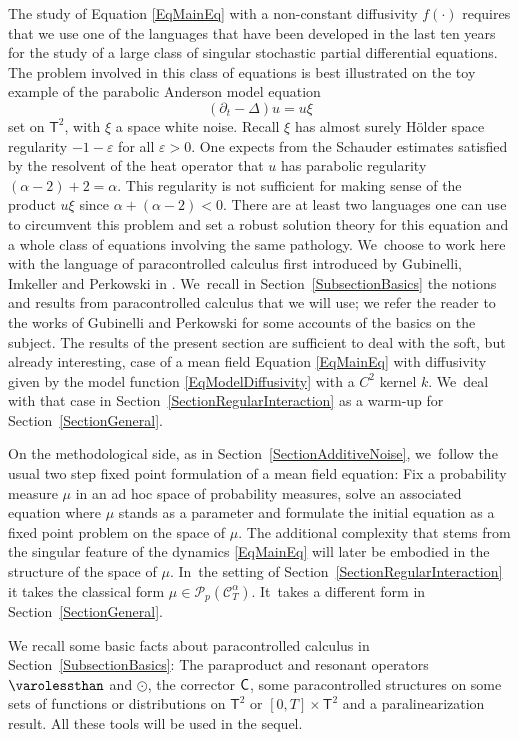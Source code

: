 \documentclass[10pt]{amsart}
\theoremstyle{definition}
\let\epsilon\varepsilon
\newcommand{\bsfT}{\mathbf{\mathsf{T}}}
\newcommand{\mcP}{\mathcal{P}}
\newcommand{\scrC}{\ensuremath{\mathscr{C}}}
\begin{document}
The study of Equation \eqref{EqMainEq} with a non-constant diffusivity $f(\cdot)$ requires that we use one of the languages that have been developed in the last ten years for the study of a large class of singular stochastic partial differential equations. The problem involved in this class of equations is best illustrated on the toy example of the parabolic Anderson model equation
\[
(\partial_t-\Delta)u = u\xi
\]
set on $\bsfT^2$, with $\xi$ a space white noise. Recall $\xi$ has almost surely Hölder space regularity $-1-\epsilon$ for all $\epsilon>0$. One expects from the Schauder estimates satisfied by the resolvent of the heat operator that $u$ has parabolic regularity $(\alpha-2)+2=\alpha$. This regularity is not sufficient for making sense of the product $u\xi$ since $\alpha + (\alpha-2)<0$. There are at least two languages one can use to circumvent this problem and set a robust solution theory for this equation and a whole class of equations involving the same pathology. We~choose to work here with the language of paracontrolled calculus first introduced by Gubinelli, Imkeller and Perkowski in \cite{GIP}. We~recall in Section~\ref{SubsectionBasics} the notions and results from paracontrolled calculus that we will use; we refer the reader to the works \cite{GPEnsaios, GubinelliPerkowskiRockner, GubinelliICM} of Gubinelli and Perkowski for some accounts of the basics on the subject. The results of the present section are sufficient to deal with the soft, but already interesting, case of a mean field Equation \eqref{EqMainEq} with diffusivity given by the model function \eqref{EqModelDiffusivity} with a $C^2$ kernel $k$. We~deal with that case in Section~\ref{SectionRegularInteraction} as a warm-up for Section~\ref{SectionGeneral}.

On the methodological side, as in Section~\ref{SectionAdditiveNoise}, we~follow the usual two step fixed point formulation of a mean field equation: Fix a probability measure $\mu$ in an ad hoc space of probability measures, solve an associated equation where $\mu$ stands as a parameter and formulate the initial equation as a fixed point problem on the space of $\mu$. The additional complexity that stems from the singular feature of the dynamics \eqref{EqMainEq} will later be embodied in the structure of the space of $\mu$. In~the setting of Section~\ref{SectionRegularInteraction} it takes the classical form $\mu \in \mcP_p(\scrC^\alpha_T)$. It~takes a different form in Section~\ref{SectionGeneral}.

We recall some basic facts about paracontrolled calculus in Section~\ref{SubsectionBasics}: The paraproduct and resonant operators $\varolessthan$ and $\odot$, the corrector $\sf C$, some paracontrolled structures on some sets of functions or distributions on $\mathsf{T}^2$ or $[0,T]\times\mathsf{T}^2$ and a paralinearization result. All these tools will be used in the sequel.
\end{document}
